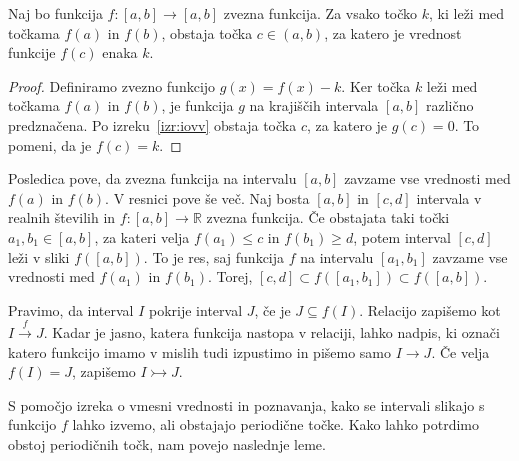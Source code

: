 \documentclass[mat2]{fmfdelo}
\newcommand{\R}{\mathbb R}
\begin{document}
\begin{posledica}\label{pos:vmesnavrednost}
Naj bo funkcija $f : [a, b] \to [a, b]$ zvezna funkcija. Za vsako točko $k$, ki leži med točkama $f(a)$ in $f(b)$, obstaja točka $c \in (a, b)$, za katero je vrednost funkcije $f(c)$ enaka $k$.
\end{posledica}
\begin{proof}
Definiramo zvezno funkcijo $g(x) = f(x) - k$. Ker točka $k$ leži med točkama $f(a)$ in $f(b)$, je funkcija $g$ na krajiščih intervala $[a, b]$ različno predznačena. Po izreku~\ref{izr:iovv} obstaja točka $c$, za katero je $g(c) = 0$. To pomeni, da je $f(c) = k$.
\end{proof}
Posledica pove, da zvezna funkcija na intervalu $[a, b]$ zavzame vse vrednosti med $f(a)$ in $f(b)$. V resnici pove še več. Naj bosta $[a, b]$ in $[c, d]$ intervala v realnih številih in $f : [a, b] \to \R$ zvezna funkcija. Če obstajata taki točki $a_1, b_1 \in [a, b]$, za kateri velja $f(a_1) \leq c$ in $f(b_1) \geq d$, potem interval $[c, d]$ leži v sliki $f([a, b])$. To je res, saj funkcija $f$ na intervalu $[a_1, b_1]$ zavzame vse vrednosti med $f(a_1)$ in $f(b_1)$. Torej, $[c, d] \subset f([a_1, b_1]) \subset f([a, b])$.

\begin{definicija}\label{def:pokritja}
Pravimo, da interval $I$ pokrije interval $J$, če je $J \subseteq f(I)$. Relacijo zapišemo kot $I \xrightarrow{f} J$. Kadar je jasno, katera funkcija nastopa v relaciji, lahko nadpis, ki označi katero funkcijo imamo v mislih tudi izpustimo in pišemo samo $I \to J$. Če velja $f(I) =J$, zapišemo $I \rightarrowtail J$.
\end{definicija}
S pomočjo izreka o vmesni vrednosti in poznavanja, kako se intervali slikajo s funkcijo $f$ lahko izvemo, ali obstajajo periodične točke. Kako lahko potrdimo obstoj periodičnih točk, nam povejo naslednje leme.
\end{document}
